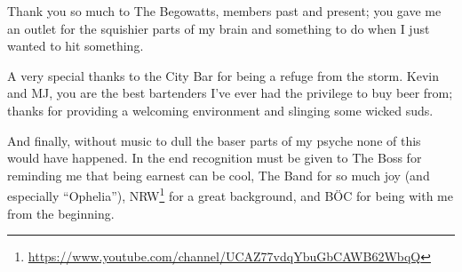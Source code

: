 Thank you so much to The Begowatts, members past and present; you gave
me an outlet for the squishier parts of my brain and something to do
when I just wanted to hit something.

A very special thanks to the City Bar for being a refuge from the
storm. Kevin and MJ, you are the best bartenders I've ever had the
privilege to buy beer from; thanks for providing a welcoming
environment and slinging some wicked suds.

And finally, without music to dull the baser parts of my psyche none
of this would have happened. In the end recognition must be given to
The Boss for reminding me that being earnest can be cool, The Band
for so much joy (and especially ``Ophelia''),
NRW\footnote{\url{https://www.youtube.com/channel/UCAZ77vdqYbuGbCAWB62WbqQ}}
for a great background, and B{\"O}C for being with me from the
beginning.
